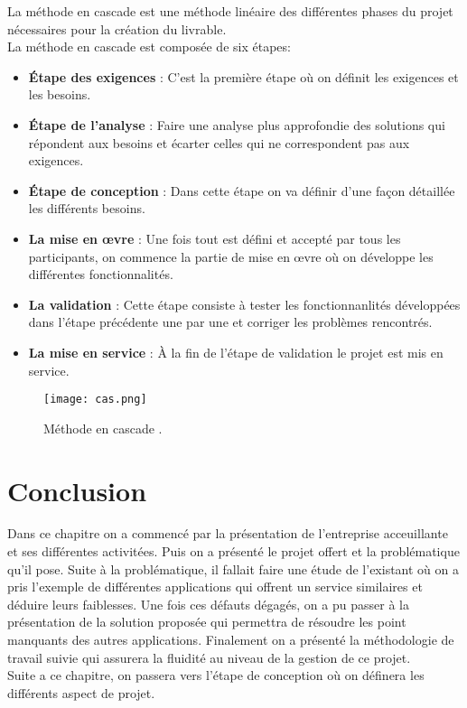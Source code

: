 La méthode en cascade est une méthode linéaire des différentes phases du projet nécessaires pour la création du livrable.\\
\noindent La méthode en cascade est composée de six étapes:
\begin{itemize}
    \item \textbf{Étape des exigences} : C'est la première étape où on définit les exigences et les besoins.
    \item \textbf{Étape de l'analyse} : Faire une analyse plus approfondie des solutions qui répondent aux besoins et écarter celles qui ne correspondent pas aux exigences.
    \item \textbf{Étape de conception} : Dans cette étape on va définir d'une façon détaillée les différents besoins.
    \item \textbf{La mise en œvre} : Une fois tout est défini et accepté par tous les participants, on commence la partie de mise en œvre où on développe les différentes fonctionnalités.
    \item \textbf{La validation} : Cette étape consiste à tester les fonctionnanlités développées dans l'étape précédente une par une et corriger les problèmes rencontrés.
    \item \textbf{La mise en service} : À la fin de l'étape de validation le projet est mis en service.
\end{itemize}
\vspace{1cm}
\begin{figure}[H]
    \centering
    \texttt{[image: cas.png]}
    \captionsetup{justification=centering}
    \caption{Méthode en cascade .}\cite{cascade}
    \label{fig:cascade}
\end{figure}

\section*{Conclusion}
Dans ce chapitre on a commencé par la présentation de l'entreprise acceuillante et ses différentes activitées. Puis on a présenté le projet offert et la problématique qu'il pose. Suite à la problématique, il fallait faire une étude de l'existant où on a pris l'exemple de différentes applications qui offrent un service similaires et déduire leurs faiblesses. Une fois ces défauts dégagés, on a pu passer à la présentation de la solution proposée qui permettra de résoudre les point manquants des autres applications. Finalement on a présenté la méthodologie de travail suivie qui assurera la fluidité au niveau de la gestion de ce projet.\\
Suite a ce chapitre, on passera vers l'étape de conception où on définera les différents aspect de projet.